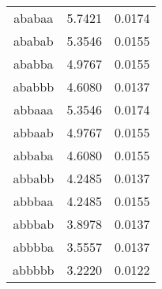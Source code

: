 \begin{figure}[hbpt]
\begin{minipage}{0.48\textwidth}
\begin{center}
\begin{tabular}{|c|c|c|}
ababaa  &  5.7421  &  0.0174  \\
ababab  &  5.3546  &  0.0155  \\
ababba  &  4.9767  &  0.0155  \\
ababbb  &  4.6080  &  0.0137  \\
abbaaa  &  5.3546  &  0.0174  \\
abbaab  &  4.9767  &  0.0155  \\
abbaba  &  4.6080  &  0.0155  \\
abbabb  &  4.2485  &  0.0137  \\
abbbaa  &  4.2485  &  0.0155  \\
abbbab  &  3.8978  &  0.0137  \\
abbbba  &  3.5557  &  0.0137  \\
abbbbb  &  3.2220  &  0.0122  \\


\end{tabular}
\end{center}
\end{minipage}
\end{figure}

